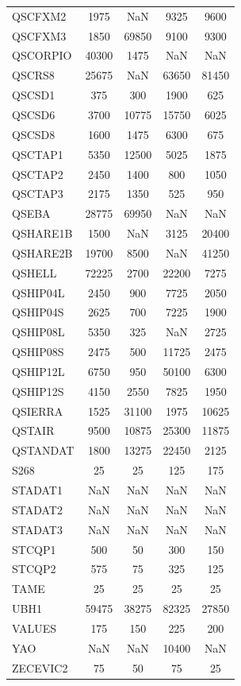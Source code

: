 \begin{longtable}{lcccc}
QSCFXM2  &     1975 &   NaN &     9325 &     9600 \\
QSCFXM3  &     1850 & 69850 &     9100 &     9300 \\
QSCORPIO &    40300 &  1475 &      NaN &      NaN \\
QSCRS8   &    25675 &   NaN &    63650 &    81450 \\
QSCSD1   &      375 &   300 &     1900 &      625 \\
QSCSD6   &     3700 & 10775 &    15750 &     6025 \\
QSCSD8   &     1600 &  1475 &     6300 &      675 \\
QSCTAP1  &     5350 & 12500 &     5025 &     1875 \\
QSCTAP2  &     2450 &  1400 &      800 &     1050 \\
QSCTAP3  &     2175 &  1350 &      525 &      950 \\
QSEBA    &    28775 & 69950 &      NaN &      NaN \\
QSHARE1B &     1500 &   NaN &     3125 &    20400 \\
QSHARE2B &    19700 &  8500 &      NaN &    41250 \\
QSHELL   &    72225 &  2700 &    22200 &     7275 \\
QSHIP04L &     2450 &   900 &     7725 &     2050 \\
QSHIP04S &     2625 &   700 &     7225 &     1900 \\
QSHIP08L &     5350 &   325 &      NaN &     2725 \\
QSHIP08S &     2475 &   500 &    11725 &     2475 \\
QSHIP12L &     6750 &   950 &    50100 &     6300 \\
QSHIP12S &     4150 &  2550 &     7825 &     1950 \\
QSIERRA  &     1525 & 31100 &     1975 &    10625 \\
QSTAIR   &     9500 & 10875 &    25300 &    11875 \\
QSTANDAT &     1800 & 13275 &    22450 &     2125 \\
S268     &       25 &    25 &      125 &      175 \\
STADAT1  &      NaN &   NaN &      NaN &      NaN \\
STADAT2  &      NaN &   NaN &      NaN &      NaN \\
STADAT3  &      NaN &   NaN &      NaN &      NaN \\
STCQP1   &      500 &    50 &      300 &      150 \\
STCQP2   &      575 &    75 &      325 &      125 \\
TAME     &       25 &    25 &       25 &       25 \\
UBH1     &    59475 & 38275 &    82325 &    27850 \\
VALUES   &      175 &   150 &      225 &      200 \\
YAO      &      NaN &   NaN &    10400 &      NaN \\
ZECEVIC2 &       75 &    50 &       75 &       25 \\
\end{longtable}
